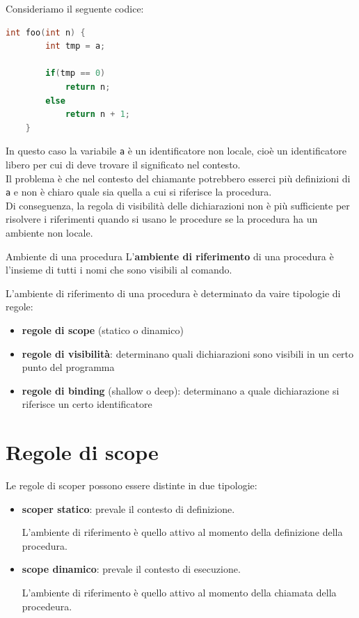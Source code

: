 Consideriamo il seguente codice:
\begin{lstlisting}[language=C, caption=programma di esempio]
    int foo(int n) {
        int tmp = a;

        if(tmp == 0)
            return n;
        else
            return n + 1;
    }
\end{lstlisting}

In questo caso la variabile \texttt{a} è un identificatore non locale, cioè un identificatore libero per cui di deve trovare il significato nel contesto.\\[0.2ex]
Il problema è che nel contesto del chiamante potrebbero esserci più definizioni di \texttt{a} e non è chiaro quale sia quella a cui si riferisce la procedura.\\[0.2ex]
Di conseguenza, la regola di visibilità delle dichiarazioni non è più sufficiente per risolvere i riferimenti quando si usano le procedure se la procedura ha un ambiente non locale.

\begin{mydef}{Ambiente di una procedura}
    L'\textbf{ambiente di riferimento} di una procedura è l'insieme di tutti i nomi che sono visibili al comando.
\end{mydef}

L'ambiente di riferimento di una procedura è determinato da vaire tipologie di regole:
\begin{itemize}[label=$\diamond$, itemsep=\smallskipamount]
    \item \textbf{regole di scope} (statico o dinamico)
    \item \textbf{regole di visibilità}: determinano quali dichiarazioni sono visibili in un certo punto del programma
    \item \textbf{regole di binding} (shallow o deep): determinano a quale dichiarazione si riferisce un certo identificatore
\end{itemize}

\section{Regole di scope}
Le regole di scoper possono essere distinte in due tipologie:
\begin{itemize}[label=$\triangleright$, itemsep=\smallskipamount]
    \item \textbf{scoper statico}: prevale il contesto di definizione.
    
    L'ambiente di riferimento è quello attivo al momento della definizione della procedura.
    \item \textbf{scope dinamico}: prevale il contesto di esecuzione.
    
    L'ambiente di riferimento è quello attivo al momento della chiamata della procedeura.
\end{itemize}

